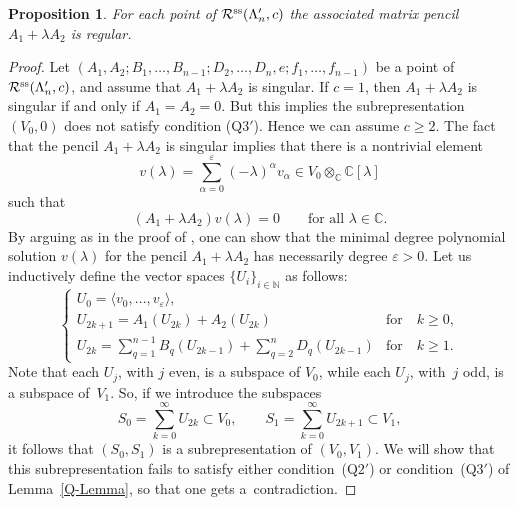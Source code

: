 \documentclass[pdftex]{sigma}
\numberwithin{equation}{section}
\newtheorem{Proposition}[Theorem]{Proposition}
 { \theoremstyle{definition}
\newtheorem{Definition}[Theorem]{Definition}
\newtheorem{Remark}[Theorem]{Remark} }
\begin{document}
\begin{Proposition}\label{prop-regular-in-R'}
For each point of $\mathcal{R}^{\rm ss}(\Lambda'_{n}, c)$ the associated matrix pencil $A_{1}+\lambda A_{2}$ is regular.
\end{Proposition}
\begin{proof}
Let $(A_1,A_2;B_1,\dots,B_{n-1};D_{2},\dots,D_{n},e;f_1,\dots,f_{n-1})$ be a point of $\mathcal{R}^{\rm ss}(\Lambda'_{n}, c)$,
and assume that $A_{1}+\lambda A_{2}$ is singular.
If $c=1$, then $A_{1}+\lambda A_{2}$ is singular if and only if $A_{1}=A_{2}=0$. But this implies the subrepresentation
$(V_0,0)$ does not satisfy condition (Q$3'$). Hence we can assume $c\geq 2$.
The fact that the pencil $A_{1}+\lambda A_{2}$ is singular implies that
there is a nontrivial element
\begin{equation}
v(\lambda)=\sum_{\alpha=0}^{\varepsilon}(-\lambda)^{\alpha}v_{\alpha} \in V_0\otimes_{\mathbb{C}}\mathbb{C}[\lambda]
\label{eq-v(l)}
\end{equation}
such that
\begin{equation}
(A_{1}+\lambda A_{2})v(\lambda)=0\qquad\text{for all $\lambda\in\mathbb{C}$.}
\label{eq-Av(l)}
\end{equation}
By arguing as in the proof of \cite[Lemma~4.11]{bblr}, one can show that the minimal degree
polynomial solution $v(\lambda)$ for the pencil $A_{1}+\lambda A_{2}$ has necessarily degree $\varepsilon >0$.
Let us inductively define the vector spaces $\{U_{i}\}_{i\in \mathbb{N}}$ as follows:
\begin{equation*}
 \begin{cases}
 U_{0}=\langle v_{0},\dots,v_{\varepsilon}\rangle, & \\
 U_{2k+1}=A_{1}(U_{2k})+A_{2}(U_{2k}) &\text{for}\quad k\geq0,\\
 \displaystyle U_{2k}=\sum\limits_{q=1}^{n-1}B_{q}(U_{2k-1})+\sum\limits_{q=2}^{n}D_{q}(U_{2k-1}) &\text{for}\quad k\geq1 .
\end{cases}
\end{equation*}
Note that each $U_{j}$, with $j$ even, is a subspace of $V_0$, while each $U_{j}$, with~$j$ odd, is a subspace of~$V_1$. So, if we introduce the subspaces
\begin{equation*}
S_{0}=\sum_{k=0}^{\infty}U_{2k} \subset V_0 ,\qquad S_{1}=\sum_{k=0}^{\infty}U_{2k+1}\subset V_1 ,
\end{equation*}
it follows that $(S_{0},S_{1})$ is a subrepresentation of $(V_0, V_1)$. We will show that this subrepresentation fails to satisfy either condition~(Q$2'$) or condition~(Q$3'$) of Lemma~\ref{Q-Lemma}, so that one gets a~contradiction.


\end{proof}
\end{document}
